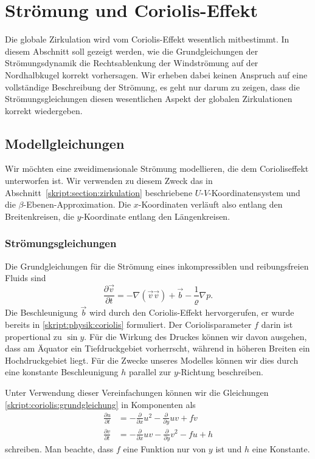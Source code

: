 %
%
%
\section{Strömung und Coriolis-Effekt}
Die globale Zirkulation wird vom Coriolis-Effekt wesentlich mitbestimmt.
In diesem Abschnitt soll gezeigt werden, wie die Grundgleichungen der
Strömungsdynamik die Rechtsablenkung der Windströmung auf der Nordhalbkugel
korrekt vorhersagen.
Wir erheben dabei keinen Anspruch auf eine vollständige Beschreibung
der Strömung, es geht nur darum zu zeigen, dass die Strömungsgleichungen
diesen wesentlichen Aspekt der globalen Zirkulationen korrekt
wiedergeben.
%

\subsection{Modellgleichungen}
Wir möchten eine zweidimensionale Strömung modellieren, die dem
Corioliseffekt unterworfen ist.
Wir verwenden zu diesem Zweck das in Abschnitt~\ref{skript:section:zirkulation}
beschriebene $U$-$V$-Koordinatensystem und die $\beta$-Ebenen-Approximation.
Die $x$-Koordinaten verläuft also entlang den Breitenkreisen, die 
$y$-Koordinate entlang den Längenkreisen.
%

\subsubsection{Strömungsgleichungen}
Die Grundgleichungen für die Strömung eines inkompressiblen und reibungsfreien
Fluids sind
\begin{equation}
\frac{\partial\vec v}{\partial t}
=
-\nabla (\vec{v}\vec{v})
+\vec{b} -\frac1{\varrho}\nabla p.
\label{skript:coriolis:grundgleichung}
\end{equation}
Die Beschleunigung $\vec{b}$ wird durch den Coriolis-Effekt hervorgerufen,
er wurde bereits in \eqref{skript:physik:coriolis} formuliert.
Der Coriolisparameter $f$ darin ist propertional zu $\sin y$.
Für die Wirkung des Druckes können wir davon ausgehen, dass
am Äquator ein Tiefdruckgebiet vorherrscht, während in höheren Breiten
ein Hochdruckgebiet liegt.
Für die Zwecke unseres Modelles können wir dies durch eine konstante
Beschleunigung $h$ parallel zur $y$-Richtung beschreiben.

Unter Verwendung dieser Vereinfachungen können wir die Gleichungen
\eqref{skript:coriolis:grundgleichung}
in Komponenten als
\begin{align}
\frac{\partial u}{\partial t}
&=
-\frac{\partial}{\partial x}u^2
-
\frac{\partial}{\partial y}uv
+
fv
\label{skript:coriolis:dudt}
\\
\frac{\partial v}{\partial t}
&=
-\frac{\partial}{\partial x}uv
-
\frac{\partial}{\partial y}v^2
-
fu
+
h
\label{skript:coriolis:dvdt}
\end{align}
schreiben.
Man beachte, dass $f$ eine Funktion nur von $y$ ist und $h$ eine Konstante.

